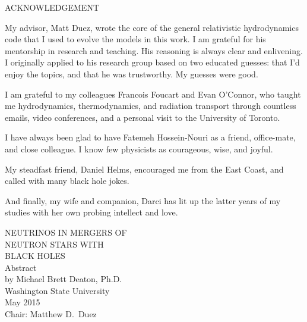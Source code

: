 \documentclass[12pt]{report}
\begin{document}
\begin{center}
  \uppercase{Acknowledgement}

  \bigskip
  My advisor, Matt Duez, wrote the core of the general relativistic hydrodynamics
  code that I used to evolve the models in this work. I am grateful for his
  mentorship in research and teaching. His reasoning is always clear and
  enlivening. I originally applied to his research group based on two educated
  guesses: that I'd enjoy the topics, and that he was trustworthy.
  My guesses were good.

  I am grateful to my colleagues Francois Foucart and Evan O'Connor, who taught
  me hydrodynamics, thermodynamics, and radiation transport through countless
  emails, video conferences, and a personal visit to the University of Toronto.

  I have always been glad to have Fatemeh Hossein-Nouri as a friend, office-mate,
  and close colleague. I know few physicists as courageous, wise, and joyful.

  My steadfast friend, Daniel Helms, encouraged me from the East Coast, and
  called with many black hole jokes.

  And finally, my wife and companion, Darci has lit up the latter years of my
  studies with her own probing intellect and love.

\end{center}
\newpage

\begin{center}
  \begin{singlespace}
    \label{ssec:abstract}

    {\uppercase{
        Neutrinos in Mergers of\\
        Neutron Stars with\\
        Black Holes}}\\
    \bigskip
    Abstract\\
    \bigskip \bigskip \bigskip
    by Michael Brett Deaton, Ph.D.\\
    Washington State University\\
    May 2015\\
    \bigskip \bigskip \bigskip
    Chair: Matthew D.\ Duez
  \end{singlespace}
\end{center}
  
\end{document}
